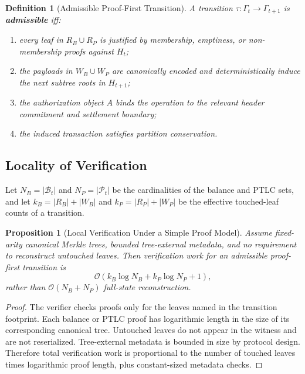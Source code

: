 \documentclass[11pt,a4paper]{article}
\newtheorem{proposition}[theorem]{Proposition}
\newtheorem{definition}[theorem]{Definition}
\begin{document}
\begin{definition}[Admissible Proof-First Transition]
A transition $\tau: \Gamma_t \rightarrow \Gamma_{t+1}$ is \textbf{admissible} iff:
\begin{enumerate}
    \item every leaf in $R_B \cup R_P$ is justified by membership, emptiness, or non-membership proofs against $H_t$;
    \item the payloads in $W_B \cup W_P$ are canonically encoded and deterministically induce the next subtree roots in $H_{t+1}$;
    \item the authorization object $A$ binds the operation to the relevant header commitment and settlement boundary;
    \item the induced transaction satisfies partition conservation.
\end{enumerate}
\end{definition}

\subsection{Locality of Verification}

Let $N_B = |\mathcal{B}_t|$ and $N_P = |\mathcal{P}_t|$ be the cardinalities of the balance and PTLC sets, and let $k_B = |R_B| + |W_B|$ and $k_P = |R_P| + |W_P|$ be the effective touched-leaf counts of a transition.

\begin{proposition}[Local Verification Under a Simple Proof Model]
Assume fixed-arity canonical Merkle trees, bounded tree-external metadata, and no requirement to reconstruct untouched leaves. Then verification work for an admissible proof-first transition is
\[
\mathcal{O}(k_B \log N_B + k_P \log N_P + 1),
\]
rather than $\mathcal{O}(N_B + N_P)$ full-state reconstruction.
\end{proposition}

\begin{proof}
The verifier checks proofs only for the leaves named in the transition footprint. Each balance or PTLC proof has logarithmic length in the size of its corresponding canonical tree. Untouched leaves do not appear in the witness and are not reserialized. Tree-external metadata is bounded in size by protocol design. Therefore total verification work is proportional to the number of touched leaves times logarithmic proof length, plus constant-sized metadata checks.
\end{proof}
\end{document}
